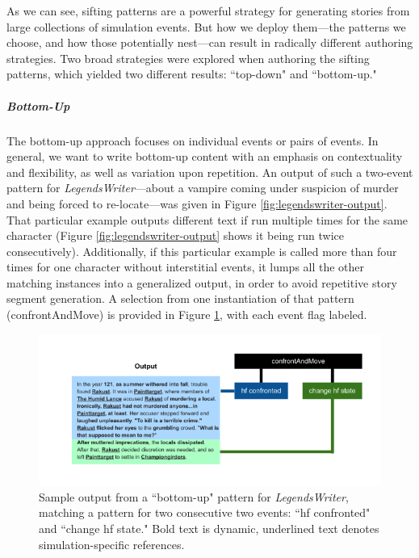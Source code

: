 As we can see, sifting patterns are a powerful strategy for generating stories from large collections of simulation events. But how we deploy them---the patterns we choose, and how those potentially nest---can result in radically different authoring strategies. Two broad strategies were explored when authoring the sifting patterns, which yielded two different results: ``top-down" and ``bottom-up."

\subparagraph{Bottom-Up}\label{subpar:delve-bottom-up}

The bottom-up approach focuses on individual events or pairs of events. In general, we want to write bottom-up content with an emphasis on contextuality and flexibility, as well as variation upon repetition. An output of such a two-event pattern for \textit{LegendsWriter}---about a vampire coming under suspicion of murder and being forced to re-locate---was given in Figure \ref{fig:legendswriter-output}. That particular example outputs different text if run multiple times for the same character (Figure \ref{fig:legendswriter-output} shows it being run twice consecutively). Additionally, if this particular example is called more than four times for one character without interstitial events, it lumps all the other matching instances into a generalized output, in order to avoid repetitive story segment generation. A selection from one instantiation of that pattern (confrontAndMove) is provided in Figure \ref{fig:legendswriter-diagram}, with each event flag labeled.


\begin{figure}
    \centering
    \includegraphics[width=\textwidth]{figures/4-Delve/legendswriter-diagram.png}
    \caption{Sample output from a ``bottom-up" pattern for \textit{LegendsWriter}, matching a pattern for two consecutive two events: ``hf confronted" and ``change hf state." Bold text is dynamic, underlined text denotes simulation-specific references.}
    \label{fig:legendswriter-diagram}
\end{figure}

